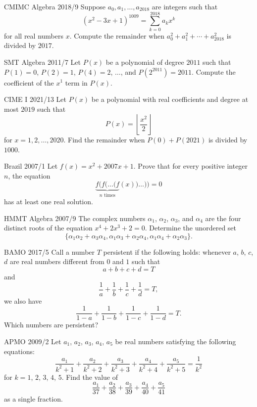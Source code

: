 \documentclass[11pt]{scrartcl}
\begin{document}
\begin{problem}[7]{CMIMC Algebra 2018/9}
Suppose $a_0,a_1,\ldots, a_{2018}$ are integers such that\[(x^2-3x+1)^{1009} = \sum_{k=0}^{2018}a_kx^k\]for all real numbers $x$. Compute the remainder when $a_0^2 + a_1^2 + \cdots + a_{2018}^2$ is divided by $2017$.
\end{problem}

\begin{problem}[8]{SMT Algebra 2011/7}
Let $P(x)$ be a polynomial of degree $2011$ such that $P(1) = 0$, $P(2) = 1$, $P(4) = 2$, $\dots$, and $P(2^{2011}) = 2011$. Compute the coefficient of the $x^1$ term in $P(x)$.
\end{problem}

\begin{problem}[9]{CIME I 2021/13}
Let $P(x)$ be a polynomial with real coefficients and degree at most $2019$ such that\[P(x) = \left\lfloor \frac{x^2}{2} \right\rfloor \]for $x = 1, 2, \dots, 2020$. Find the remainder when $P(0) + P(2021)$ is divided by $1000$.
\end{problem}

\begin{problem}[10]{Brazil 2007/1}
Let $f(x) = x^2 + 2007x + 1$. Prove that for every positive integer $n$, the equation \[\underbrace{f(f(\dots(f}_{n\text{ times}}(x))\ldots)) = 0\] has at least one real solution.
\end{problem}

\begin{problem}[11]{HMMT Algebra 2007/9}
The complex numbers $\alpha_1$, $\alpha_2$, $\alpha_3$, and $\alpha_4$ are the four distinct roots of the equation $x^4+2x^3+2 = 0$. Determine the unordered set \[\{\alpha_1\alpha_2+\alpha_3\alpha_4, \alpha_1\alpha_3+\alpha_2\alpha_4, \alpha_1\alpha_4+\alpha_2\alpha_3\}.\]
\end{problem}

\begin{problem}[12]{BAMO 2017/5}
Call a number $T$ persistent if the following holds: whenever $a$, $b$, $c$, $d$ are real numbers different from $0$ and $1$ such that \[a+b+c+d = T\] and \[\dfrac{1}{a}+\dfrac{1}{b}+\dfrac{1}{c}+\dfrac{1}{d} = T,\] we also have \[\dfrac{1}{1-a}+\dfrac{1}{1-b}+\dfrac{1}{1-c}+\dfrac{1}{1-d} = T.\] Which numbers are persistent?
\end{problem}

\begin{problem}[13]{APMO 2009/2}
Let $a_1$, $a_2$, $a_3$, $a_4$, $a_5$ be real numbers satisfying the following equations: \[\frac{a_1}{k^2+1}+\frac{a_2}{k^2+2}+\frac{a_3}{k^2+3}+\frac{a_4}{k^2+4}+\frac{a_5}{k^2+5} = \frac{1}{k^2}\] for $k = 1$, $2$, $3$, $4$, $5$. Find the value of \[\frac{a_1}{37}+\frac{a_2}{38}+\frac{a_3}{39}+\frac{a_4}{40}+\frac{a_5}{41}\] as a single fraction.
\end{problem}
\end{document}
